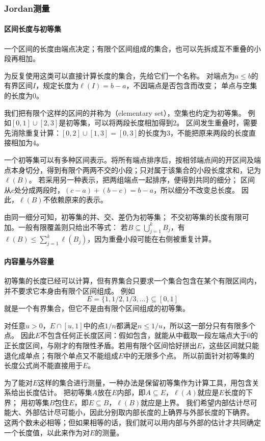 \subsubsection{Jordan测量}

\paragraph{区间长度与初等集}

一个区间的长度由端点决定；有限个区间组成的集合，也可以先拆成互不重叠的小段再相加。

为反复使用这类可以直接计算长度的集合，先给它们一个名称。
对端点为$a\leq b$的有界区间$I$，规定长度为$\ell(I)=b-a$，不因端点是否包含而改变；
单点与空集的长度为$0$。

我们把有限个这样的区间的并称为（elementary set），空集也约定为初等集。
例如$[0,1]\cup[2,3]$是初等集，可以将两段长度相加得到$2$。
区间发生重叠时，需要先消除重复计算：$[0,2]\cup[1,3]=[0,3]$的长度为$3$，不能把原来两段的长度直接相加为$4$。

一个初等集可以有多种区间表示。将所有端点排序后，按相邻端点间的开区间及端点本身切分，得到有限个两两不交的小段；只对属于该集合的小段长度求和，记为$\ell(B)$。
若采用另一种表示，把两组端点一起排序，便得到共同的细分；
区间从$c$处分成两段时，$(c-a)+(b-c)=b-a$，所以细分不改变总长度。
因此，$\ell(B)$不依赖原来的表示。

由同一细分可知，初等集的并、交、差仍为初等集；
不交初等集的长度有限可加。一般有限覆盖则只给出不等式：
若$B\subseteq\bigcup_{j=1}^k B_j$，有
$\ell(B)\leq\sum_{j=1}^k\ell(B_j)$，因为重叠小段可能在右侧被重复计算。

\paragraph{内容量与外容量}

初等集的长度已经可以计算，但有界集合只要求一个集合包含在某个有限区间内，并不要求它本身由有限个区间组成。
例如
\[
 E=\{1,1/2,1/3,\ldots\}\subseteq[0,1]
\]
就是一个有界集合，但它不是由有限个区间组成的初等集。

对任意$u>0$，$E\cap[u,1]$中的点$1/n$都满足$n\leq1/u$，所以这一部分只有有限多个点。
因此$E$不包含任何正长度区间：假如包含，就能从中截取一段左端点大于$0$的正长度区间，与刚才的有限性矛盾。若用有限个区间恰好拼出$E$，这些区间就只能退化成单点；有限个单点又不能组成$E$中的无限多个点。
所以前面针对初等集的长度公式尚不能直接用于$E$。

为了能对$E$这样的集合进行测量，一种办法是保留初等集作为计算工具，用包含关系给出长度估计。
把初等集$A$放在$E$内部，即$A\subseteq E$，$\ell(A)$就应是$E$长度的下界；
用初等集$B$包住$E$，即$E\subseteq B$，$\ell(B)$就应是上界。
我们希望内部估计尽可能大、外部估计尽可能小，因此分别取内部长度的上确界与外部长度的下确界。
这两个数未必相等；但如果相等的话，我们就可以用内部与外部的估计才共同确定一个长度值，以此来作为对$E$的测量。


